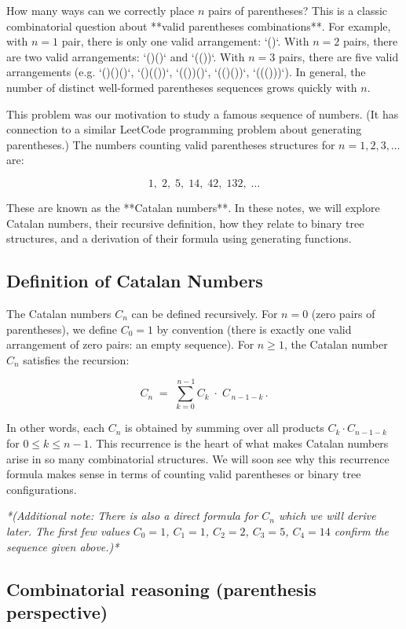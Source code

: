 \documentclass{article}
\begin{document}
How many ways can we correctly place $n$ pairs of parentheses? This is a classic combinatorial question about **valid parentheses combinations**. For example, with $n=1$ pair, there is only one valid arrangement: `()`. With $n=2$ pairs, there are two valid arrangements: `()()` and `(())`. With $n=3$ pairs, there are five valid arrangements (e.g. `()()()`, `()(())`, `(())()`, `(()())`, `((()))`). In general, the number of distinct well-formed parentheses sequences grows quickly with $n$. 

This problem was our motivation to study a famous sequence of numbers. (It has connection to a similar LeetCode programming problem about generating parentheses.) The numbers counting valid parentheses structures for $n=1,2,3,\dots$ are:

\[1,\; 2,\; 5,\; 14,\; 42,\; 132,\;\dots\]

These are known as the **Catalan numbers**. In these notes, we will explore Catalan numbers, their recursive definition, how they relate to binary tree structures, and a derivation of their formula using generating functions.

\subsection{Definition of Catalan Numbers}

The Catalan numbers $C_n$ can be defined recursively. For $n=0$ (zero pairs of parentheses), we define $C_0 = 1$ by convention (there is exactly one valid arrangement of zero pairs: an empty sequence). For $n\ge 1$, the Catalan number $C_n$ satisfies the recursion:

\[
C_n \;=\; \sum_{k=0}^{\,n-1} C_k \;\cdot\; C_{\,n-1-k}\,.
\]

In other words, each $C_n$ is obtained by summing over all products $C_k \cdot C_{n-1-k}$ for $0 \le k \le n-1$. This recurrence is the heart of what makes Catalan numbers arise in so many combinatorial structures. We will soon see why this recurrence formula makes sense in terms of counting valid parentheses or binary tree configurations.

\textit{*(Additional note: There is also a direct formula for $C_n$ which we will derive later. The first few values $C_0=1$, $C_1=1$, $C_2=2$, $C_3=5$, $C_4=14$ confirm the sequence given above.)*}

\subsection*{Combinatorial reasoning (parenthesis perspective)}
\end{document}
